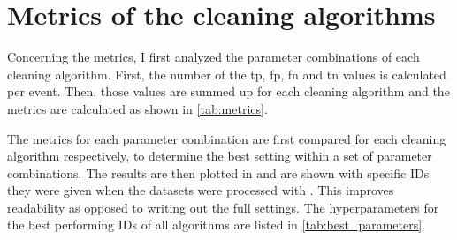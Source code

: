 \section{Metrics of the cleaning algorithms}
\label{sec:metrics}
Concerning the metrics, I first analyzed the parameter combinations of each cleaning algorithm. First,
the number of the \gls{tp}, \gls{fp}, \gls{fn} and \gls{tn} values is calculated per event. Then,
those values are summed up for each cleaning algorithm and the metrics are calculated as shown in
\autoref{tab:metrics}.

The metrics for each parameter combination are first compared for each cleaning algorithm respectively,
to determine the best setting within a set of parameter combinations. The results are then plotted in
and are shown with specific IDs they were given when the datasets were processed with \ctapipe.
This improves readability as opposed to writing out the full settings. The hyperparameters for the best performing
IDs of all algorithms are listed in \autoref{tab:best_parameters}.

